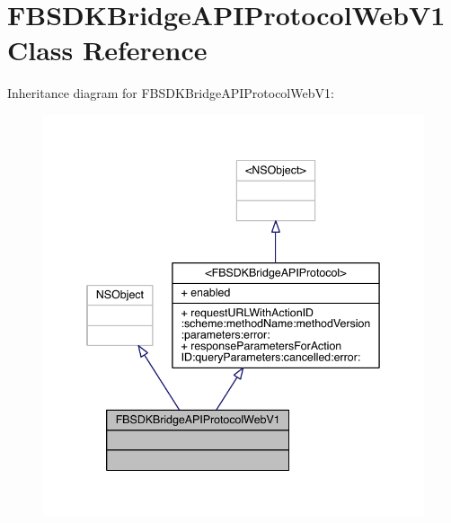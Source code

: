 \hypertarget{interface_f_b_s_d_k_bridge_a_p_i_protocol_web_v1}{\section{F\-B\-S\-D\-K\-Bridge\-A\-P\-I\-Protocol\-Web\-V1 Class Reference}
\label{interface_f_b_s_d_k_bridge_a_p_i_protocol_web_v1}
}


Inheritance diagram for F\-B\-S\-D\-K\-Bridge\-A\-P\-I\-Protocol\-Web\-V1\-:
\nopagebreak
\begin{figure}[H]
\begin{center}
\leavevmode
\includegraphics[width=342pt]{interface_f_b_s_d_k_bridge_a_p_i_protocol_web_v1__inherit__graph}
\end{center}
\end{figure}


